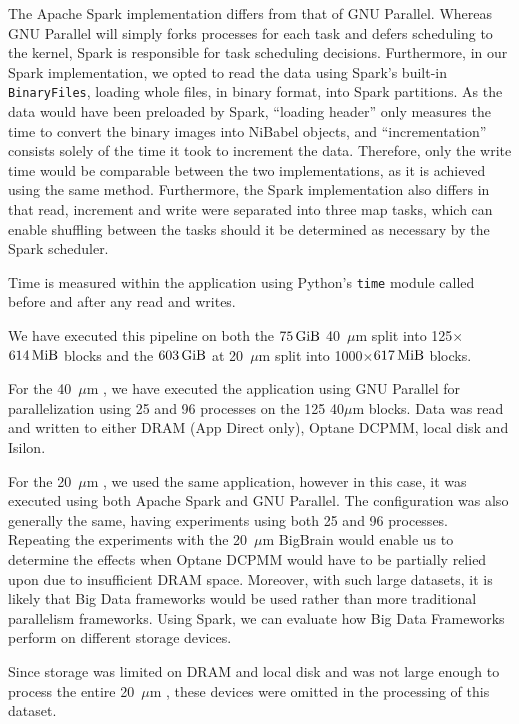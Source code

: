 The Apache Spark implementation differs from that of GNU Parallel. Whereas GNU
Parallel will simply forks processes for each task and defers scheduling to the
kernel, Spark is responsible for task scheduling decisions. Furthermore, in our
Spark implementation, we opted to read the data using Spark's built-in
\texttt{BinaryFiles}, loading whole files, in binary format, into Spark
partitions. As the data would have been preloaded by Spark, ``loading header''
only measures the time to convert the binary images into NiBabel objects, and
``incrementation'' consists solely of the time it took to increment the data.
Therefore, only the write time would be comparable between the two
implementations, as it is achieved using the same method. Furthermore, the Spark
implementation also differs in that read, increment and write were separated
into three map tasks, which can enable shuffling between the tasks should it be
determined as necessary by the Spark scheduler.

Time is measured within the application using Python's \texttt{time} module
called before and after any read and writes.

We have executed this pipeline on both the $\SI{75}{\gibi\byte}$ 40~$\mu$m
\bigbrain split into 125$\times$$\SI{614}{\mebi\byte}$ blocks and the
$\SI{603}{\gibi\byte}$ \bigbrain at 20~$\mu$m split into
1000$\times$$\SI{617}{\mebi\byte}$ blocks.

For the 40~$\mu$m \bigbrain, we have executed the application using GNU Parallel
for parallelization using 25 and 96 processes on the 125 40$\mu$m \bigbrain
blocks. Data was read and written to either DRAM (App Direct only), Optane
DCPMM, local disk and Isilon. 

For the 20~$\mu$m \bigbrain, we used the same application, however in this case,
it was executed using both Apache Spark and GNU Parallel. The configuration was
also generally the same, having experiments using both 25 and 96 processes.
Repeating the experiments with the 20~$\mu$m BigBrain would enable us to
determine the effects when Optane DCPMM would have to be partially relied upon
due to insufficient DRAM space. Moreover, with such large datasets, it is likely
that Big Data frameworks would be used rather than more traditional parallelism
frameworks. Using Spark, we can evaluate how Big Data Frameworks perform on
different storage devices.

Since storage was limited on DRAM and local disk and was not large enough to
process the entire 20~$\mu$m \bigbrain, these devices were omitted in the
processing of this dataset. 

